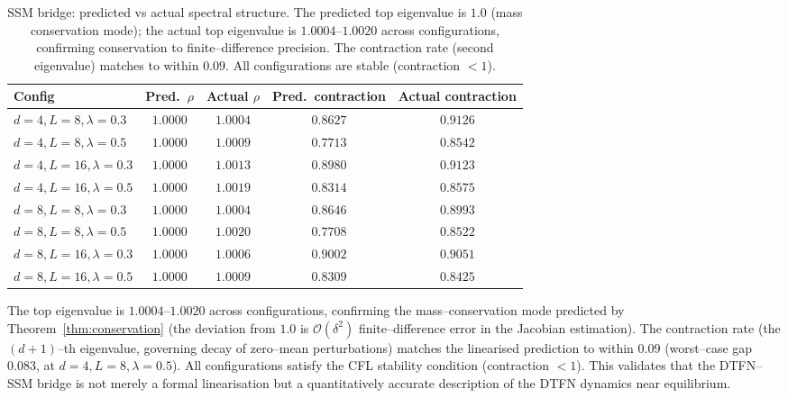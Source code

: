 \documentclass[10pt]{article}
\theoremstyle{definition}
\theoremstyle{remark}
\begin{document}
\begin{table}[h]
  \centering
  \caption{SSM bridge: predicted vs actual spectral structure.  The
    predicted top eigenvalue is $1.0$ (mass conservation mode); the
    actual top eigenvalue is $1.0004$--$1.0020$ across configurations,
    confirming conservation to finite--difference precision.  The
    contraction rate (second eigenvalue) matches to within $0.09$.
    All configurations are stable (contraction $< 1$).}
  \label{tab:ssm-bridge}
  \begin{tabular}{lcccc}
    \toprule
    Config & Pred.\ $\rho$ & Actual $\rho$ & Pred.\ contraction & Actual contraction \\
    \midrule
    $d{=}4, L{=}8, \lambda{=}0.3$  & $1.0000$ & $1.0004$ & $0.8627$ & $0.9126$ \\
    $d{=}4, L{=}8, \lambda{=}0.5$  & $1.0000$ & $1.0009$ & $0.7713$ & $0.8542$ \\
    $d{=}4, L{=}16, \lambda{=}0.3$ & $1.0000$ & $1.0013$ & $0.8980$ & $0.9123$ \\
    $d{=}4, L{=}16, \lambda{=}0.5$ & $1.0000$ & $1.0019$ & $0.8314$ & $0.8575$ \\
    $d{=}8, L{=}8, \lambda{=}0.3$  & $1.0000$ & $1.0004$ & $0.8646$ & $0.8993$ \\
    $d{=}8, L{=}8, \lambda{=}0.5$  & $1.0000$ & $1.0020$ & $0.7708$ & $0.8522$ \\
    $d{=}8, L{=}16, \lambda{=}0.3$ & $1.0000$ & $1.0006$ & $0.9002$ & $0.9051$ \\
    $d{=}8, L{=}16, \lambda{=}0.5$ & $1.0000$ & $1.0009$ & $0.8309$ & $0.8425$ \\
    \bottomrule
  \end{tabular}
\end{table}

The top eigenvalue is $1.0004$--$1.0020$ across configurations,
confirming the mass--conservation mode predicted by
Theorem~\ref{thm:conservation} (the deviation from $1.0$ is
$\mathcal{O}(\delta^2)$ finite--difference error in the Jacobian
estimation).  The contraction rate (the $(d{+}1)$--th eigenvalue,
governing decay of zero--mean perturbations) matches the linearised
prediction to within $0.09$ (worst--case gap $0.083$, at
$d{=}4, L{=}8, \lambda{=}0.5$).  All configurations satisfy the CFL
stability condition (contraction $< 1$).  This validates that the
DTFN--SSM bridge is not merely a formal linearisation but a
quantitatively accurate
description of the DTFN dynamics near equilibrium.
\end{document}
